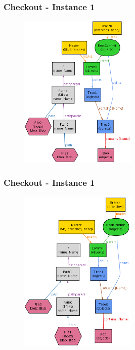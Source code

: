 \documentclass{beamer}
\begin{document}
\begin{frame}[fragile]
   \frametitle{Checkout - Instance 1}
      \begin{figure}
         \centering
         \includegraphics[width=0.50\textwidth]{images/checkout1.png}
      \end{figure}
\end{frame}

\begin{frame}[fragile]
   \frametitle{Checkout - Instance 1}
      \begin{figure}
         \centering
         \includegraphics[width=0.50\textwidth]{images/checkout2.png}
      \end{figure}
\end{frame}
\end{document}
